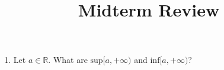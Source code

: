 \documentclass[10pt,a4paper,oneside]{book}
\title{Midterm Review}
\author{}
\date{}
\begin{document}
\maketitle

\begin{enumerate}
    \item Let $a\in \mathbb{R}$. What are $\text{sup}[a,+\infty)$ and $\text{inf}[a,+\infty)$?
    
 
\end{enumerate}
\end{document}
